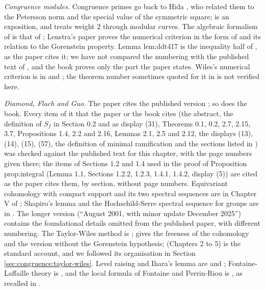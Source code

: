 \emph{Congruence modules.} Congruence primes go back to Hida \cite{Hida81}, who related them to the Petersson norm and the special value of the symmetric square; \cite{HidaBook} is an
exposition, and \cite{Ribet83} treats weight $2$ through modular curves. The algebraic formalism of  is that of \cite[Section 4]{DDT}; Lenstra's
paper \cite{Lenstra95} proves the numerical criterion in the form of  and its relation to the Gorenstein property. Lemma lem:ddt417 is the inequality half of
\cite[Lemma 4.17]{DDT}, as the paper cites it; we have not compared the numbering with the published text of \cite{DDT}, and the book proves only the part the paper states. Wiles's
numerical criterion is in \cite[Appendix]{Wiles95} and \cite[Section 5]{DDT}; the theorem number sometimes quoted for it in \cite{DDT} is not verified here.

\emph{Diamond, Flach and Guo.} The paper cites the published version \cite{DFG04}; so does the book. Every item of it that the paper or the book cites (the abstract, the definition of $S_f$ in
Section 0.2 and as display (31), Theorems 0.1, 0.2, 2.7, 2.15, 3.7, Propositions 1.4, 2.2 and 2.16, Lemmas 2.1, 2.5 and 2.12, the displays (13), (14), (15), (57), the definition
of minimal ramification and the sections listed in ) was checked against the published text for this chapter, with the page numbers given there; the items of
Sections 1.2 and 1.4 used in the proof of Proposition prop:integral (Lemma 1.1, Sections 1.2.2, 1.2.3, 1.4.1, 1.4.2, display (5)) are cited as the paper cites them, by section, without page numbers. Equivariant
cohomology with compact support and its two spectral sequences are in Chapter V of \cite{Grothendieck57}; Shapiro's lemma and the Hochschild-Serre spectral sequence for groups are in \cite{Brown}. The longer version \cite{DFG04long} (``August 2001, with minor update December
2025'') contains the foundational details omitted from the published paper, with different numbering. The Taylor-Wiles method is \cite{Wiles95,TaylorWiles}; \cite{Diamond96} gives the freeness
of the cohomology and the version without the Gorenstein hypothesis; \cite{DDT} (Chapters 2 to 5) is the standard account, and we followed its organisation in
Section \ref{sec:congruence:taylor-wiles}. Level raising and Ihara's lemma are \cite{Ribet84,Ribet90} and \cite{DiamondTaylor94}; Fontaine-Laffaille theory is \cite{FontaineLaffaille}, and the
local formula of Fontaine and Perrin-Riou is \cite[I.4.2.2]{FPR94}, as recalled in \cite{DFG04}.

